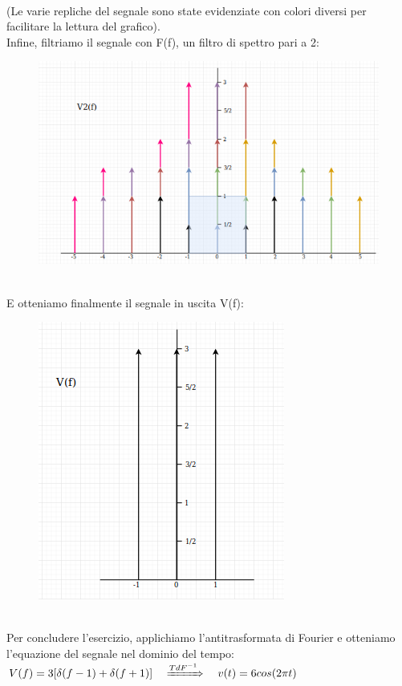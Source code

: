 \documentclass[12pt,a4paper]{article}
\begin{document}
	\\(Le varie repliche del segnale sono state evidenziate con colori diversi per facilitare la lettura del grafico).\\
	Infine, filtriamo il segnale con F(f), un filtro di spettro pari a 2:
	\begin{figure}[h!]
		\centering
		\includegraphics[scale=0.4]{./images/fourier55_7.png}
	\end{figure}
	\\E otteniamo finalmente il segnale in uscita V(f):
	\begin{figure}[h!]
		\centering
		\includegraphics[scale=0.4]{./images/fourier55_8.png}
	\end{figure}
	\\Per concludere l'esercizio, applichiamo l'antitrasformata di Fourier e otteniamo l'equazione del segnale nel dominio del tempo:
	$V(f) = 3[\delta(f-1) + \delta(f+1)]\quad\xRightarrow[]{TdF^{-1}}\quad v(t) = 6cos(2\pi t)$
\end{document}
